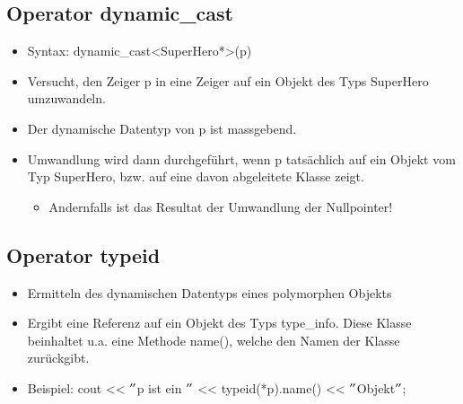 \subsection{Operator dynamic\_cast}
\label{sec:dynamic cast}
\begin{itemize}
	\item Syntax: dynamic\_cast<SuperHero*>(p)
	\item Versucht, den Zeiger p in eine Zeiger auf ein Objekt des Typs SuperHero umzuwandeln.
	\item Der dynamische Datentyp von p ist massgebend.
	\item Umwandlung wird dann durchgeführt, wenn p tatsächlich auf ein Objekt vom Typ SuperHero, bzw. auf eine davon abgeleitete Klasse zeigt.
	\begin{itemize}
		\item Andernfalls ist das Resultat der Umwandlung der Nullpointer!
	\end{itemize}
\end{itemize}

\subsection{Operator typeid}
\begin{itemize}
	\item Ermitteln des dynamischen Datentyps eines polymorphen Objekts
	\item Ergibt eine Referenz auf ein Objekt des Typs type\_info. Diese Klasse beinhaltet u.a. eine Methode name(), welche den Namen der Klasse zurückgibt.
	\item Beispiel:
	\subitem cout << $"$p ist ein $"$ << typeid(*p).name() << $"$Objekt$"$;
\end{itemize}


